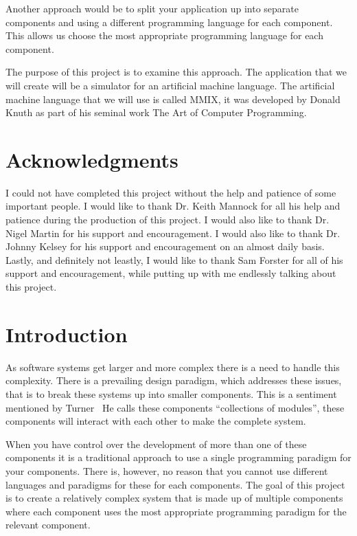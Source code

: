 \documentclass[a4paper,11pt]{report}
\begin{document}
Another approach would be to split your application up into separate components and using a different programming language for each component. This allows us choose the most appropriate programming language for each component.

The purpose of this project is to examine this approach. The application that we will create will be a simulator for an artificial machine language. The artificial machine language that we will use is called MMIX, it was developed by Donald Knuth as part of his seminal work The Art of Computer Programming\cite{knuth:aocp1}.
\newpage
{}
\tableofcontents
\newpage
\listoffigures
\newpage
\chapter*{Acknowledgments}
I could not have completed this project without the help and patience of some important people. I would like to thank Dr. Keith Mannock for all his help and patience during the production of this project. I would also like to thank Dr. Nigel Martin for his support and encouragement. I would also like to thank Dr. Johnny Kelsey for his support and encouragement on an almost daily basis. Lastly, and definitely not leastly, I would like to thank Sam Forster for all of his support and encouragement, while putting up with me endlessly talking about this project.

\chapter{Introduction}
As software systems get larger and more complex there is a need to handle this complexity. There is a prevailing design paradigm, which addresses these issues, that is to break these systems up into smaller components.  This is a sentiment mentioned by Turner~\cite{turner:why}  He calls these components ``collections of modules'', these components will interact with each other to make the complete system. 

When you have control over the development of more than one of these components it is a traditional approach to use a single programming paradigm for your components. There is, however, no reason that you cannot use different languages and paradigms for these for each components. The goal of this project is to create a relatively complex system that is made up of multiple components where each component uses the most appropriate programming paradigm for the relevant component.
\end{document}
